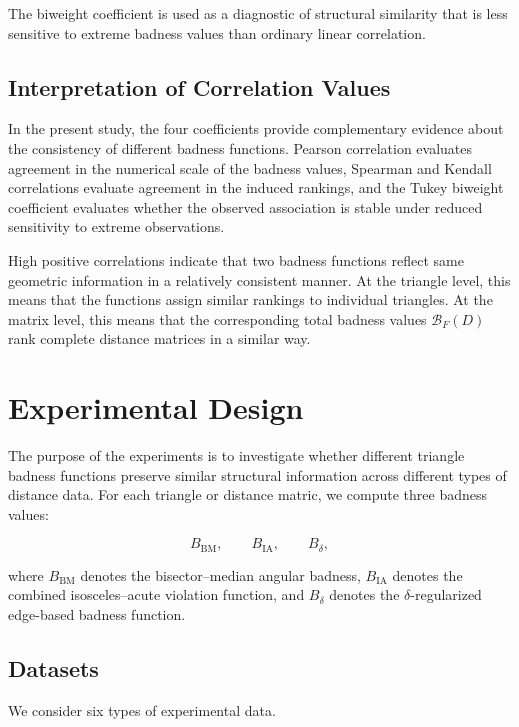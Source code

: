 \documentclass[11pt]{article}
\begin{document}
The biweight coefficient is used as a diagnostic of structural similarity that is less sensitive to extreme badness values than ordinary linear correlation.

\subsection{Interpretation of Correlation Values}

In the present study, the four coefficients provide complementary evidence about the consistency of different badness functions. Pearson correlation evaluates agreement in the numerical scale of the badness values, Spearman and Kendall correlations evaluate agreement in the induced rankings, and the Tukey biweight coefficient evaluates whether the observed association is stable under reduced sensitivity to extreme observations.


High positive correlations indicate that two badness functions reflect same geometric information in a relatively consistent manner. At the triangle level, this means that the functions assign similar rankings to individual triangles. At the matrix level, this means that the corresponding total badness values \(\mathcal{B}_F(D)\) rank complete distance matrices in a similar way.

\section{Experimental Design}\label{sec:design}

The purpose of the experiments is to investigate whether different triangle badness functions preserve similar structural information across different types of distance data. For each triangle or  distance matric, we compute three badness values:

\[
B_{\mathrm{BM}},\qquad
B_{\mathrm{IA}},\qquad
B_{\delta},
\]

where \(B_{\mathrm{BM}}\) denotes the bisector--median angular badness, \(B_{\mathrm{IA}}\) denotes the combined isosceles--acute violation function, and \(B_{\delta}\) denotes the \(\delta\)-regularized edge-based badness function.

\subsection{Datasets}
\label{sec:datasets}

We consider six types of experimental data.
\end{document}

